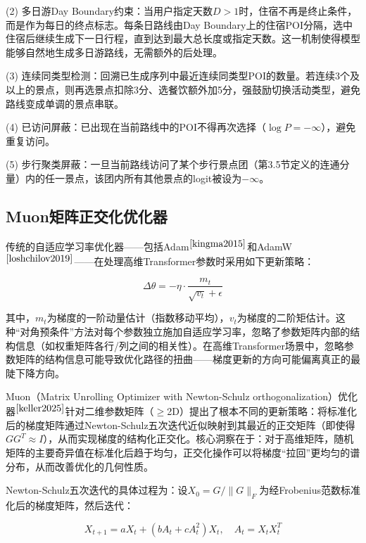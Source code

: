 \documentclass[12pt,a4paper]{ctexart}
\begin{document}
(2) 多日游Day Boundary约束：当用户指定天数$D>1$时，住宿不再是终止条件，而是作为每日的终点标志。每条日路线由Day Boundary上的住宿POI分隔，选中住宿后继续生成下一日行程，直到达到最大总长度或指定天数。这一机制使得模型能够自然地生成多日游路线，无需额外的后处理。

(3) 连续同类型检测：回溯已生成序列中最近连续同类型POI的数量。若连续3个及以上的景点，则再选景点扣除3分、选餐饮额外加5分，强鼓励切换活动类型，避免路线变成单调的景点串联。

(4) 已访问屏蔽：已出现在当前路线中的POI不得再次选择（$\log P=-\infty$），避免重复访问。

(5) 步行聚类屏蔽：一旦当前路线访问了某个步行景点团（第3.5节定义的连通分量）内的任一景点，该团内所有其他景点的logit被设为$-\infty$。

\subsection{Muon矩阵正交化优化器}

传统的自适应学习率优化器——包括Adam$^{\cite{kingma2015}}$和AdamW$^{\cite{loshchilov2019}}$——在处理高维Transformer参数时采用如下更新策略：

\begin{equation}
\Delta\theta = -\eta \cdot \frac{m_t}{\sqrt{v_t}+\epsilon}
\end{equation}

其中，$m_t$为梯度的一阶动量估计（指数移动平均），$v_t$为梯度的二阶矩估计。这种“对角预条件”方法对每个参数独立施加自适应学习率，忽略了参数矩阵内部的结构信息（如权重矩阵各行/列之间的相关性）。在高维Transformer场景中，忽略参数矩阵的结构信息可能导致优化路径的扭曲——梯度更新的方向可能偏离真正的最陡下降方向。

Muon（Matrix Unrolling Optimizer with Newton-Schulz orthogonalization）优化器$^{\cite{keller2025}}$针对二维参数矩阵（$\geq$2D）提出了根本不同的更新策略：将标准化后的梯度矩阵通过Newton-Schulz五次迭代近似映射到其最近的正交矩阵（即使得$GG^T\approx I$），从而实现梯度的结构化正交化。核心洞察在于：对于高维矩阵，随机矩阵的主要奇异值在标准化后趋于均匀，正交化操作可以将梯度“拉回”更均匀的谱分布，从而改善优化的几何性质。

Newton-Schulz五次迭代的具体过程为：设$X_0=G/\|G\|_F$为经Frobenius范数标准化后的梯度矩阵，然后迭代：

\begin{equation}
X_{t+1} = a X_t + (b A_t + c A_t^2) X_t,\quad A_t = X_t X_t^T
\label{eq:ns_iter}
\end{equation}
\end{document}
